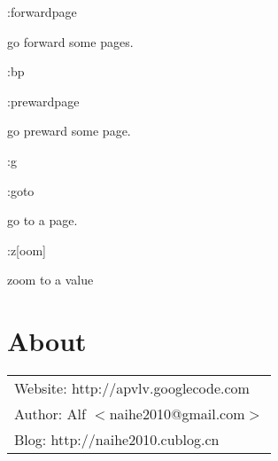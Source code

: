 \documentclass[a4paper,12pt]{article}
\begin{document}
\begin{description}
\item :forwardpage 

go forward some pages.

\item :bp

\item :prewardpage

go preward some page.

\item :g

\item :goto

go to a page.

\item :z[oom]

zoom to a value

\end{description}

\newpage

\section{About}

\large
\begin{tabular}{l}
Website: http://apvlv.googlecode.com \\
Author: Alf $<$naihe2010@gmail.com$>$ \\
Blog: http://naihe2010.cublog.cn
\end{tabular}
\end{document}
